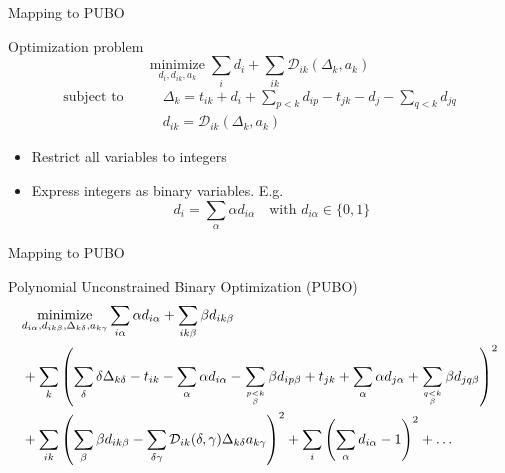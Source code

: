 \documentclass[10pt]{beamer}
\begin{document}
\begin{frame}[t]{Mapping to PUBO}
    \begin{block}{Optimization problem}
        \begin{equation*}
            \underset{d_i, d_{ik}, a_k}{\text{minimize}} \; \sum_i d_i + \sum_{ik} \mathcal{D}_{ik}(\Delta_{k}, a_k)
        \end{equation*}
        \begin{align*}
            \text{subject to} \qquad
            & \Delta_{k} = t_{ik} + d_i + \sum_{p<k} d_{ip} - t_{jk} - d_j - \sum_{q<k} d_{jq} \\
            & d_{ik} = \mathcal{D}_{ik}(\Delta_{k}, a_k) 
        \end{align*}
    \end{block}

    \begin{itemize}
        \item Restrict all variables to integers
        \item Express integers as binary variables. E.g.
            \begin{equation*}
                d_i = \sum_\alpha \alpha d_{i\alpha}\quad \text{with } d_{i\alpha} \in \{0, 1\}
            \end{equation*}
    \end{itemize}
\end{frame}
\begin{frame}[t]{Mapping to PUBO}
    \begin{block}{Polynomial Unconstrained Binary Optimization (PUBO)}
        \begin{align*}
            &\underset{d_{i\alpha}, d_{ik\beta}, \Delta_{k\delta}, a_{k\gamma}}{\text{minimize}}  \sum_{i\alpha} \alpha d_{i\alpha} 
            + \sum_{ik\beta} \beta d_{ik\beta} \\
            &+ \sum_k \left(\sum_\delta \delta \Delta_{k\delta} - t_{ik} - \sum_\alpha \alpha d_{i\alpha} - \sum_{p<k \atop \beta} \beta d_{ip\beta} + t_{jk} + \sum_\alpha \alpha d_{j\alpha} + \sum_{q<k \atop \beta} \beta d_{jq\beta}\right)^2 \\
            &+ \sum_{ik} \left(\sum_\beta \beta d_{ik\beta} - \sum_{\delta\gamma} \mathcal{D}_{ik}(\delta, \gamma)  \Delta_{k\delta} a_{k\gamma} \right)^2
            + \sum_i \left(\sum_\alpha d_{i\alpha} - 1 \right)^2 + \dots
        \end{align*}
    \end{block}
\end{frame}
\end{document}
